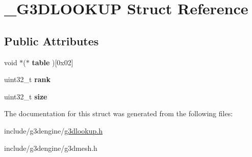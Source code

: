 \hypertarget{struct__G3DLOOKUP}{}\section{\+\_\+\+G3\+D\+L\+O\+O\+K\+UP Struct Reference}
\label{struct__G3DLOOKUP}
\subsection*{Public Attributes}
\begin{DoxyCompactItemize}
\item 
\mbox{\label{struct__G3DLOOKUP_a53b8b372b4f261acc63d3f6c10abecd5}} 
void $\ast$($\ast$ {\bfseries table} )\mbox{[}0x02\mbox{]}
\item 
\mbox{\label{struct__G3DLOOKUP_a34a0a1b3b63b81bf0687f2747e3c8da3}} 
uint32\+\_\+t {\bfseries rank}
\item 
\mbox{\label{struct__G3DLOOKUP_a326281cfba10ac9f05b5e8b977ba3a0a}} 
uint32\+\_\+t {\bfseries size}
\end{DoxyCompactItemize}


The documentation for this struct was generated from the following files\+:\begin{DoxyCompactItemize}
\item 
include/g3dengine/\hyperlink{g3dlookup_8h}{g3dlookup.\+h}\item 
include/g3dengine/g3dmesh.\+h\end{DoxyCompactItemize}
